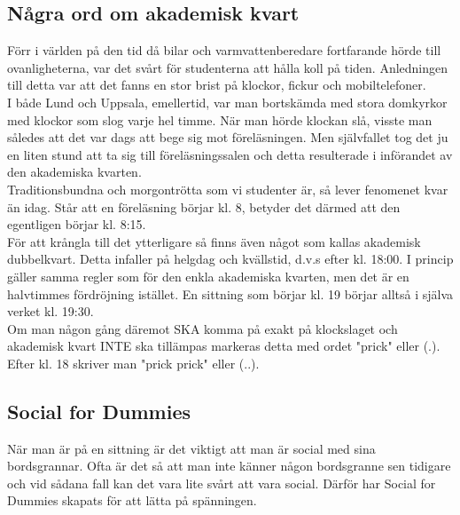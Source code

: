 \newpage

\subsection*{Några ord om akademisk kvart}

Förr i världen på den tid då bilar och varmvattenberedare
fortfarande hörde till ovanligheterna, var det svårt för studenterna 
att hålla koll på tiden. Anledningen till detta var att det fanns en
stor brist på klockor, fickur och mobiltelefoner.
\\

I både Lund och Uppsala, emellertid, var man bortskämda 
med stora domkyrkor med klockor som slog varje hel timme.
När man hörde klockan slå, visste man således att det var
dags att bege sig mot föreläsningen. Men självfallet tog det
ju en liten stund att ta sig till föreläsningssalen och detta
resulterade i införandet av den akademiska kvarten.
\\

Traditionsbundna och morgontrötta som vi studenter
är, så lever fenomenet kvar än idag. Står att en
föreläsning börjar kl. 8, betyder det därmed att den
egentligen börjar kl. 8:15.
\\

För att krångla till det ytterligare så finns även något 
som kallas akademisk dubbelkvart. Detta infaller på
helgdag och kvällstid, d.v.s efter kl. 18:00. I princip 
gäller samma regler som för den enkla akademiska kvarten,
men det är en halvtimmes fördröjning istället. En sittning
som börjar kl. 19 börjar alltså i själva verket kl. 19:30.
\\

Om man någon gång däremot SKA komma på
exakt på klockslaget och akademisk kvart
INTE ska tillämpas markeras detta med ordet "prick" eller (.).
Efter kl. 18 skriver man "prick prick" eller (..).
\\

\newpage


\subsection*{Social for Dummies}
När man är på en sittning är det viktigt att man är social med sina bordsgrannar. 
Ofta är det så att man inte känner någon bordsgranne sen tidigare och vid sådana 
fall kan det vara lite svårt att vara social. Därför har Social for Dummies 
skapats för att lätta på spänningen.
\\


